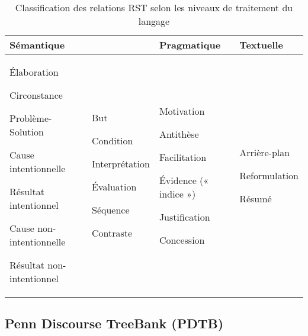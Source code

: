 \documentclass{KodeBook}
\begin{document}
\begin{table}[ht]
	\centering\small
\begin{tabular}{p{}p{}p{}p{}}
	\hline\hline
	\textbf{Sémantique} && \textbf{Pragmatique} & \textbf{Textuelle} \\
	\hline
	
	Élaboration
	
	Circonstance
	
	Problème-Solution
	
	Cause intentionnelle
	
	Résultat intentionnel
	
	Cause non-intentionnelle
	
	Résultat non-intentionnel
	&
	But
	
	Condition
	
	Interprétation
	
	Évaluation
	
	Séquence
	
	Contraste
	
	&
	
	Motivation
	
	Antithèse
	
	Facilitation
	
	Évidence (« indice »)
	
	Justification
	
	Concession
	
	&
	
	Arrière-plan
	
	Reformulation
	
	Résumé\\
	\hline\hline
\end{tabular}
\caption[Classification des relations RST selon les niveaux de traitement du langage]{Classification des relations RST selon les niveaux de traitement du langage \cite{2006-Cornish}}
\label{tab:rst-niveau}
\end{table}

\subsection{Penn Discourse TreeBank (PDTB)}
\end{document}
